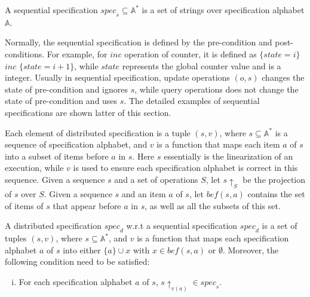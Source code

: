 \begin{definition}
\label{definition:sequential specification}
A sequential specification $\mathit{spec}_s \subseteq \mathbb{A}^*$ is a set of strings over specification alphabet $\mathbb{A}$.
\end{definition} 

Normally, the sequential specification is defined by the pre-condition and post-conditions. For example, for $inc$ operation of counter, it is defined as $\{ state = i \}$ $inc$ $\{ state = i+1 \}$, while $state$ represents the global counter value and is a integer. Usually in sequential specification, update operations $(o,s)$ changes the state of pre-condition and ignores $s$, while query operations does not change the state of pre-condition and uses $s$. The detailed examples of sequential specifications are shown latter of this section.

 Each element of distributed specification is a tuple $(s,v)$, where $s \subseteq \mathbb{A}^*$ is a sequence of specification alphabet, and $v$ is a function that maps each item $a$ of $s$ into a subset of items before $a$ in $s$. Here $s$ essentially is the linearization of an execution, while $v$ is used to ensure each specification alphabet is correct in this sequence. %
Given a sequence $s$ and a set of operations $S$, let $s \uparrow_{S}$ be the projection of $s$ over $S$. Given a sequence $s$ and an item $a$ of $s$, let $\mathit{bef}(s,a)$ contains the set of items of $s$ that appear before $a$ in $s$, as well as all the subsets of this set.

\begin{definition}
\label{definition:distributed specification}
A distributed specification $\mathit{spec}_d$ w.r.t a sequential specification $\mathit{spec}_d$ is a set of tuples $(s,v)$, where $s \subseteq \mathbb{A}^*$, and %
$v$ is a function that maps each specification alphabet $a$ of $s$ into either $\{ a \} \cup x$ with $ x \in \mathit{bef}(s,a)$ or $\emptyset$. Moreover, the following condition need to be satisfied:

\begin{enumerate}[(i)]
\item For each specification alphabet $a$ of $s$, $s \uparrow_{v(a)} \in \mathit{spec}_s$.
\end{enumerate}
\end{definition}

